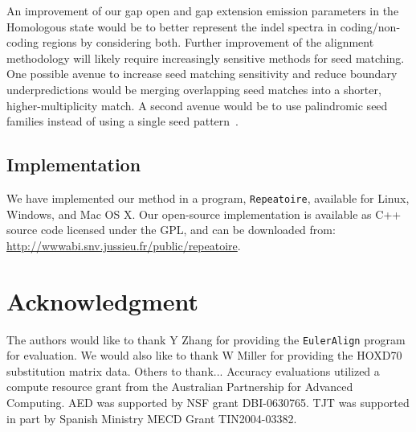 \documentclass[12pt,journal,draftcls,letterpaper,onecolumn]{IEEEtran}
\begin{document}
An improvement of our gap open and gap extension emission parameters in the Homologous state would be to better represent the indel spectra in coding/non-coding regions by considering both. Further improvement of the alignment methodology will likely require increasingly sensitive methods for
seed matching. One possible avenue to increase seed matching sensitivity and reduce boundary underpredictions would be merging overlapping seed matches into a
shorter, higher-multiplicity match.  A second avenue would be to use palindromic seed families instead of using a single seed pattern~\cite{ref-pattern}.

\subsection*{Implementation}
We have implemented our method in a program, \texttt{Repeatoire},
available for Linux, Windows, and Mac OS X. Our open-source
implementation is available as C++ source code licensed under the GPL, and can be downloaded from: \\
\url{http://wwwabi.snv.jussieu.fr/public/repeatoire}.

\section{ Acknowledgment }
The authors would like to thank Y Zhang for providing the
\texttt{EulerAlign} program for evaluation. We would also like to thank
W Miller for providing the HOXD70 substitution matrix data. Others to thank... Accuracy
evaluations utilized a compute resource grant from the Australian
Partnership for Advanced Computing.  AED was supported by NSF grant
DBI-0630765. TJT was supported in part by Spanish Ministry MECD Grant
TIN2004-03382.



%
%
%
\end{document}
